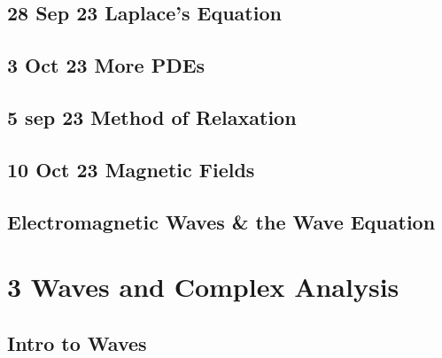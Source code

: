 \documentclass[letterpaper,10pt,english]{jupyterBook}
\begin{document}
\sphinxstepscope


\chapter{28 Sep 23 \sphinxhyphen{} Laplace’s Equation}
\label{\detokenize{content/2_EM/laplace_eq:sep-23-laplace-s-equation}}\label{\detokenize{content/2_EM/laplace_eq::doc}}
\sphinxstepscope


\chapter{3 Oct 23 \sphinxhyphen{} More PDEs}
\label{\detokenize{content/2_EM/more_PDEs:oct-23-more-pdes}}\label{\detokenize{content/2_EM/more_PDEs::doc}}
\sphinxstepscope


\chapter{5 sep 23 \sphinxhyphen{} Method of Relaxation}
\label{\detokenize{content/2_EM/relaxation:sep-23-method-of-relaxation}}\label{\detokenize{content/2_EM/relaxation::doc}}
\sphinxstepscope


\chapter{10 Oct 23 \sphinxhyphen{} Magnetic Fields}
\label{\detokenize{content/2_EM/B_fields:oct-23-magnetic-fields}}\label{\detokenize{content/2_EM/B_fields::doc}}
\sphinxstepscope


\chapter{Electromagnetic Waves \& the Wave Equation}
\label{\detokenize{content/2_EM/EM_waves:electromagnetic-waves-the-wave-equation}}\label{\detokenize{content/2_EM/EM_waves::doc}}
\sphinxstepscope


\part{3 \sphinxhyphen{} Waves and Complex Analysis}

\sphinxstepscope


\chapter{Intro to Waves}
\label{\detokenize{content/3_waves/waves_intro:intro-to-waves}}\label{\detokenize{content/3_waves/waves_intro::doc}}
\sphinxstepscope
\end{document}
